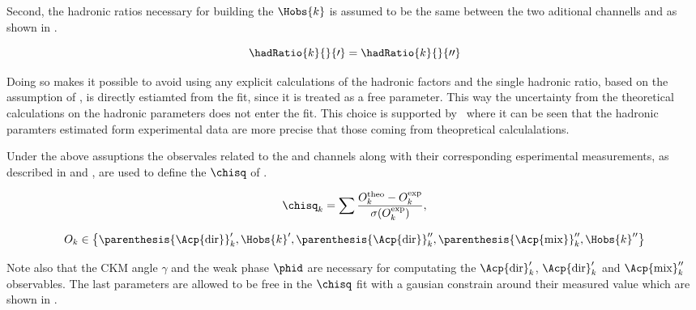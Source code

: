 \noindent Second, the hadronic ratios necessary for building the $\Hobs{k}$ is assumed to be the same between
the two aditional channells \BsJpsiKst and \BdJpsiRho as shown in .

\begin{equation}
  \centering
  \hadRatio{k}{}{\prime} =
  \hadRatio{k}{}{\prime\prime}
    \label{had_ratios_assuption}
\end{equation}

\noindent Doing so makes it possible to avoid using any explicit calculations of the hadronic factors
and the single hadronic ratio, based on the assumption of , is directly
estiamted from the fit, since it is treated as a free parameter. This way the uncertainty from the theoretical
calculations on the hadronic parameters does not enter the fit. This choice is supported by~\cite{DeBruyn-thesis}
where it can be seen that the hadronic paramters estimated form experimental data are more precise
that those coming from theopretical calculalations.

Under the above assuptions the observales related to the \BsJpsiKst and \BdJpsiRho channels along
with their corresponding esperimental measurements, as described in  and
, are used to define the $\chisq$ of .

\begin{equation}
  \centering
  \chisq_k = \sum \frac{O^{\rm theo}_k - O^{\rm exp}_k} {\sigma(O^{\rm exp}_k)},
  \label{chisq_form}
\end{equation}


\begin{equation}
  \centering
  O_k \in \left\{ \parenthesis{\Acp{\rm dir}}'_k, \Hobs{k}', \parenthesis{\Acp{\rm dir}}''_k, \parenthesis{\Acp{\rm mix}}''_k, \Hobs{k}'' \right\}
  \label{chisq_form_with}
\end{equation}

\noindent Note also that the CKM angle $\gamma$ and the weak phase $\phid$ are necessary for computating the ${\Acp{\rm dir}}'_k$,
${\Acp{\rm dir}}'_k$ and ${\Acp{\rm mix}}''_k$ observables. The last parameters are allowed to be free in the
$\chisq$ fit with a gausian constrain around their measured value which are shown in .

